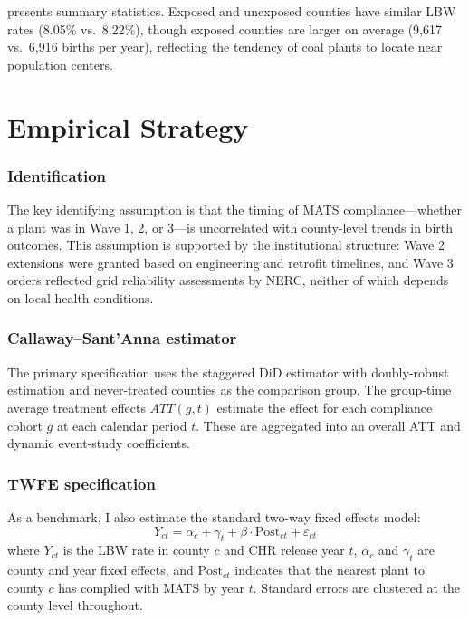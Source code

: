 \documentclass[12pt]{article}
\begin{document}


 presents summary statistics. Exposed and unexposed counties have similar LBW rates (8.05\% vs.\ 8.22\%), though exposed counties are larger on average (9,617 vs.\ 6,916 births per year), reflecting the tendency of coal plants to locate near population centers.


\section{Empirical Strategy}

\subsubsection*{Identification} The key identifying assumption is that the timing of MATS compliance---whether a plant was in Wave 1, 2, or 3---is uncorrelated with county-level trends in birth outcomes. This assumption is supported by the institutional structure: Wave 2 extensions were granted based on engineering and retrofit timelines, and Wave 3 orders reflected grid reliability assessments by NERC, neither of which depends on local health conditions.

\subsubsection*{Callaway--Sant'Anna estimator} The primary specification uses the \citet{callaway2021difference} staggered DiD estimator with doubly-robust estimation and never-treated counties as the comparison group. The group-time average treatment effects $ATT(g,t)$ estimate the effect for each compliance cohort $g$ at each calendar period $t$. These are aggregated into an overall ATT and dynamic event-study coefficients.

\subsubsection*{TWFE specification} As a benchmark, I also estimate the standard two-way fixed effects model:
\begin{equation}
  Y_{ct} = \alpha_c + \gamma_t + \beta \cdot \text{Post}_{ct} + \varepsilon_{ct}
\end{equation}
where $Y_{ct}$ is the LBW rate in county $c$ and CHR release year $t$, $\alpha_c$ and $\gamma_t$ are county and year fixed effects, and $\text{Post}_{ct}$ indicates that the nearest plant to county $c$ has complied with MATS by year $t$. Standard errors are clustered at the county level throughout.
\end{document}

